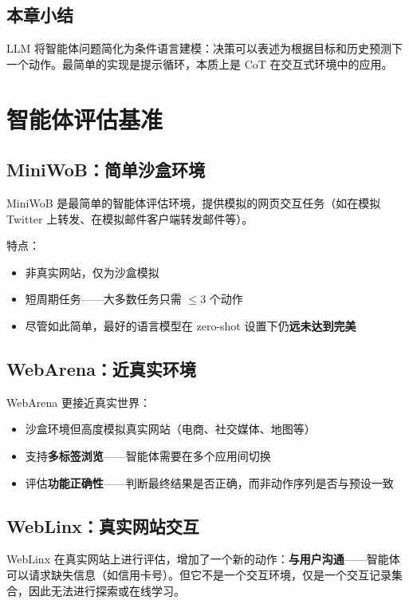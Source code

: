 \documentclass[a4paper]{article}
\begin{document}
\subsection{本章小结}

LLM 将智能体问题简化为条件语言建模：决策可以表述为根据目标和历史预测下一个动作。最简单的实现是提示循环，本质上是 CoT 在交互式环境中的应用。


\section{智能体评估基准}

\subsection{MiniWoB：简单沙盒环境}

MiniWoB 是最简单的智能体评估环境，提供模拟的网页交互任务（如在模拟 Twitter 上转发、在模拟邮件客户端转发邮件等）。

特点：
\begin{itemize}
    \item 非真实网站，仅为沙盒模拟
    \item 短周期任务——大多数任务只需 $\leq 3$ 个动作
    \item 尽管如此简单，最好的语言模型在 zero-shot 设置下仍\textbf{远未达到完美}
\end{itemize}

\subsection{WebArena：近真实环境}

WebArena 更接近真实世界：

\begin{itemize}
    \item 沙盒环境但高度模拟真实网站（电商、社交媒体、地图等）
    \item 支持\textbf{多标签浏览}——智能体需要在多个应用间切换
    \item 评估\textbf{功能正确性}——判断最终结果是否正确，而非动作序列是否与预设一致
\end{itemize}

\subsection{WebLinx：真实网站交互}

WebLinx 在真实网站上进行评估，增加了一个新的动作：\textbf{与用户沟通}——智能体可以请求缺失信息（如信用卡号）。但它不是一个交互环境，仅是一个交互记录集合，因此无法进行探索或在线学习。
\end{document}
